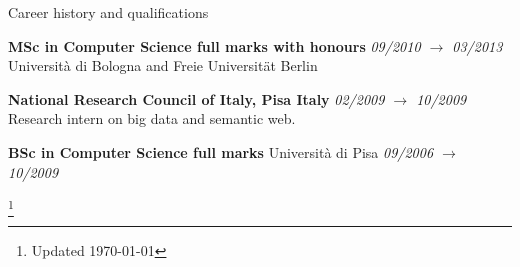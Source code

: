 \documentclass{resume}
\begin{document}
\begin{rSection}{Career history and qualifications}

		{\bf MSc in Computer Science full marks with honours} \hfill {\em 09/2010 $\rightarrow$ 03/2013} \\
		Universit\`a di Bologna and Freie Universit\"at Berlin 

		{\bf National Research Council of Italy, Pisa Italy} \hfill {\em 02/2009 $\rightarrow$ 10/2009}\\
			Research intern on big data and semantic web.

		{\bf BSc in Computer Science full marks} Universit\`a di Pisa \hfill {\em 09/2006 $\rightarrow$ 10/2009} \\
	\end{rSection}
	\footnote{Updated \today}
\end{document}
